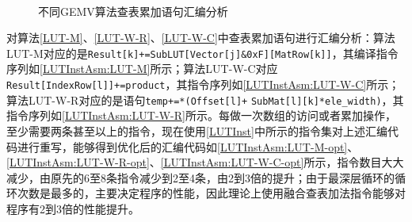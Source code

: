 \begin{figure}[htbp!]
	\centering
    \\
	\label{LUTInstAsm}
	\caption{不同GEMV算法查表累加语句汇编分析}
\end{figure}

对算法\ref{LUT-M}、\ref{LUT-W-R}、\ref{LUT-W-C}中查表累加语句进行汇编分析：算法LUT-M对应的是\verb|Result[k]+=SubLUT[Vector[j]&0xF][MatRow[k]]|，其编译指令序列如\ref{LUTInstAsm:LUT-M}所示；算法LUT-W-C对应\verb|Result[IndexRow[l]]+=product|，其指令序列如\ref{LUTInstAsm:LUT-W-C}所示；算法LUT-W-R对应的是语句\verb|temp+=*(Offset[l]+|     \verb|SubMat[l][k]*ele_width)|，其指令序列如\ref{LUTInstAsm:LUT-W-R}所示。每做一次数组的访问或者累加操作，至少需要两条甚至以上的指令，现在使用\ref{LUTInst}中所示的指令集对上述汇编代码进行重写，能够得到优化后的汇编代码如\ref{LUTInstAsm:LUT-M-opt}、\ref{LUTInstAsm:LUT-W-R-opt}、\ref{LUTInstAsm:LUT-W-C-opt}所示，指令数目大大减少，由原先的6至8条指令减少到2至4条，由2到3倍的提升；由于最深层循环的循环次数是最多的，主要决定程序的性能，因此理论上使用融合查表加法指令能够对程序有2到3倍的性能提升。

